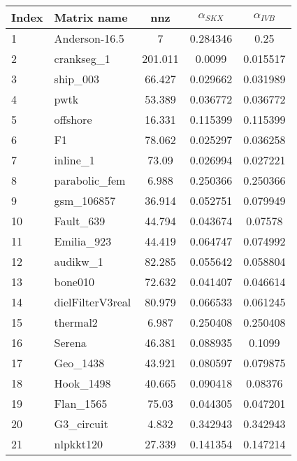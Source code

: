 \begin{tabular}{|l|l|S[round-mode=places,round-precision=2]|S[round-mode=places,round-precision=4]|S[round-mode=places,round-precision=4]|}
\toprule
{Index} & {Matrix name} &  {nnz} & {$\alpha_{SKX}$} & {$\alpha_{IVB}$}  \\
\midrule
{1}& {	Anderson-16.5             }	& 7	& 0.284346	& 0.25	\\
{2}& {	crankseg\_1                }	& 201.011	& 0.0099	& 0.015517	\\
{3}& {	ship\_003                  }	& 66.427	& 0.029662	& 0.031989	\\
{4}& {	pwtk                      }	& 53.389	& 0.036772	& 0.036772	\\
{5}& {	offshore                  }	& 16.331	& 0.115399	& 0.115399	\\
{6}& {	F1                        }	& 78.062	& 0.025297	& 0.036258	\\
{7}& {	inline\_1                  }	& 73.09	& 0.026994	& 0.027221	\\
{8}& {	parabolic\_fem             }	& 6.988	& 0.250366	& 0.250366	\\
{9}& {	gsm\_106857                }	& 36.914	& 0.052751	& 0.079949	\\
{10}& {	Fault\_639                 }	& 44.794	& 0.043674	& 0.07578	\\
{11}& {	Emilia\_923                }	& 44.419	& 0.064747	& 0.074992	\\
{12}& {	audikw\_1                  }	& 82.285	& 0.055642	& 0.058804	\\
{13}& {	bone010                   }	& 72.632	& 0.041407	& 0.046614	\\
{14}& {	dielFilterV3real          }	& 80.979	& 0.066533	& 0.061245	\\
{15}& {	thermal2                  }	& 6.987	& 0.250408	& 0.250408	\\
{16}& {	Serena                    }	& 46.381	& 0.088935	& 0.1099	\\
{17}& {	Geo\_1438                  }	& 43.921	& 0.080597	& 0.079875	\\
{18}& {	Hook\_1498                 }	& 40.665	& 0.090418	& 0.08376	\\
{19}& {	Flan\_1565                 }	& 75.03	& 0.044305	& 0.047201	\\
{20}& {	G3\_circuit                }	& 4.832	& 0.342943	& 0.342943	\\
{21}& {	nlpkkt120                 }	& 27.339	& 0.141354	& 0.147214	\\

\end{tabular}
